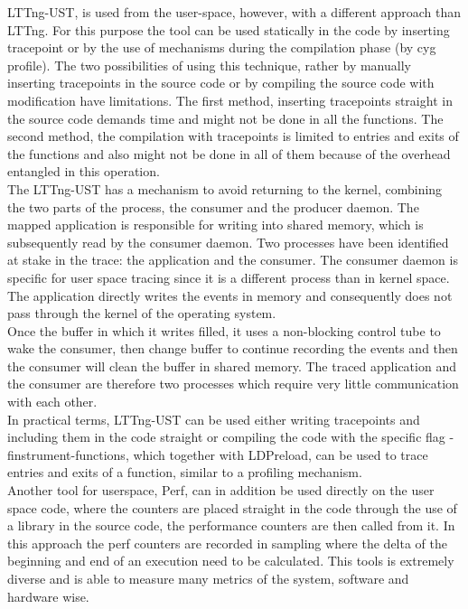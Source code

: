LTTng-UST, is used from the user-space, however, with a different approach than LTTng. For this purpose the tool can be used statically in the code by inserting tracepoint or by the use of mechanisms during the compilation phase (by cyg profile). The two possibilities of using this technique, rather by manually inserting tracepoints in the source code or by compiling the source code with modification have limitations. The first method, inserting tracepoints straight in the source code demands time and might not be done in all the functions. The second method, the compilation with tracepoints is limited to entries and exits of the functions and also might not be done in all of them because of the overhead entangled in this operation.\\
The LTTng-UST has a mechanism to avoid returning to the kernel, combining the two parts of the process, the consumer and the producer daemon. The mapped application is responsible for writing into shared memory, which is subsequently read by the consumer daemon. Two processes have been identified at stake in the trace: the application and the consumer. The consumer daemon is specific for user space tracing since it is a different process than in kernel space. The application directly writes the events in memory and consequently does not pass through the kernel of the operating system. \\
Once the buffer in which it writes filled, it uses a non-blocking control tube to wake the consumer, then change buffer to continue recording the events and then the consumer will clean the buffer in shared memory. The traced application and the consumer are therefore two processes which require very little communication with each other.\\
In practical terms, LTTng-UST can be used either writing tracepoints and including them in the code straight or compiling the code with the specific flag -finstrument-functions, which together with LDPreload, can be used to trace entries and exits of a function, similar to a profiling mechanism.\\
Another tool for userspace, Perf, can in addition be used directly on the user space code, where the counters are placed straight in the code through the use of a library in the source code, the performance counters are then called from it. In this approach the perf counters are recorded in sampling where the delta of the beginning and end of an execution need to be calculated. This tools is extremely diverse and is able to measure many metrics of the system, software and hardware wise. \\
